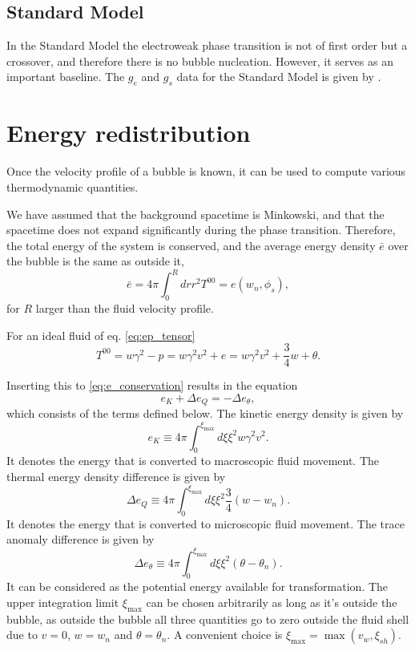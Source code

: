 \subsection{Standard Model}
In the Standard Model the electroweak phase transition is not of first order but a crossover,
and therefore there is no bubble nucleation.
However, it serves as an important baseline.
The $g_e$ and $g_s$ data for the Standard Model is given by \cite{borsanyi_lattice_2016}.


\section{Energy redistribution}
\label{energy_redistribution}
Once the velocity profile of a bubble is known, it can be used to compute various thermodynamic quantities.

We have assumed that the background spacetime is Minkowski, and that the spacetime does not expand significantly during the phase transition.
Therefore, the total energy of the system is conserved, and the average energy density $\bar{e}$ over the bubble is the same as outside it,
\begin{equation}
\bar{e} = 4 \pi \int_0^R dr r^2 T^{00} = e(w_n, \phi_s),
\label{eq:e_conservation}
\end{equation}
for $R$ larger than the fluid velocity profile.

For an ideal fluid of eq. \eqref{eq:ep_tensor}
\begin{equation}
T^{00} = w\gamma^2 - p = w\gamma^2 v^2 + e = w\gamma^2 v^2 + \frac{3}{4}w + \theta.
\end{equation}

Inserting this to \eqref{eq:e_conservation} results in the equation
\begin{equation}
e_K + \Delta e_Q = - \Delta e_\theta,
\end{equation}
which consists of the terms defined below.
The kinetic energy density is given by
\begin{equation}
e_K \equiv 4 \pi \int_0^{\xi_\text{max}} d\xi \xi^2 w \gamma^2 v^2.
\end{equation}
It denotes the energy that is converted to macroscopic fluid movement.
The thermal energy density difference is given by
\begin{equation}
\Delta e_Q \equiv 4 \pi \int_0^{\xi_\text{max}} d\xi \xi^2 \frac{3}{4} (w - w_n).
\end{equation}
It denotes the energy that is converted to microscopic fluid movement.
The trace anomaly difference is given by
\begin{equation}
\Delta e_\theta \equiv 4 \pi \int_0^{\xi_\text{max}} d\xi \xi^2 (\theta - \theta_n).
\end{equation}
It can be considered as the potential energy available for transformation.
The upper integration limit $\xi_\text{max}$ can be chosen arbitrarily as long as it's outside the bubble, as outside the bubble all three quantities go to zero outside the fluid shell due to $v=0$, $w=w_n$ and $\theta = \theta_n$.
A convenient choice is $\xi_\text{max} = \max (v_w, \xi_{sh})$.

